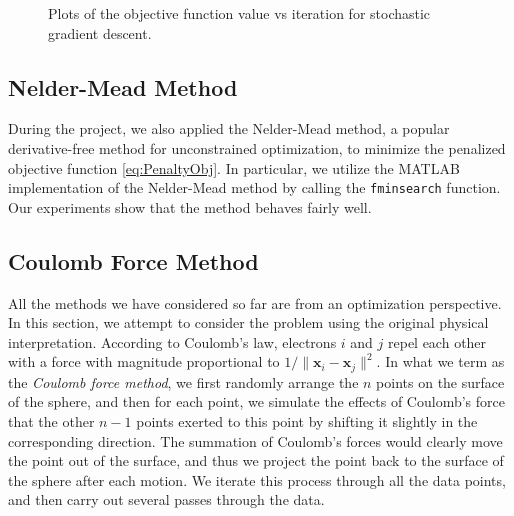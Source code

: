 \documentclass[11pt]{article}
\begin{document}
\begin{figure}[ht]
  \centering
  \caption{Plots of the objective function value vs iteration for stochastic gradient descent.}
  \label{fig:SGDObj}
\end{figure}

\subsection{Nelder-Mead Method}

During the project, we also applied the Nelder-Mead method, a popular derivative-free method for unconstrained optimization, to minimize the penalized objective function \eqref{eq:PenaltyObj}. In particular, we utilize the MATLAB implementation of the Nelder-Mead method by calling the \texttt{fminsearch} function. Our experiments show that the method behaves fairly well.

\subsection{Coulomb Force Method}

All the methods we have considered so far are from an optimization perspective. In this section, we attempt to consider the problem using the original physical interpretation. According to Coulomb's law, electrons $i$ and $j$ repel each other with a force with magnitude proportional to $1/\|\bm{x}_i-\bm{x}_j\|^2$. In what we term as the \emph{Coulomb force method}, we first randomly arrange the $n$ points on the surface of the sphere, and then for each point, we simulate the effects of Coulomb's force that the other $n-1$ points exerted to this point by shifting it slightly in the corresponding direction. The summation of Coulomb's forces would clearly move the point out of the surface, and thus we project the point back to the surface of the sphere after each motion. We iterate this process through all the data points, and then carry out several passes through the data.
\end{document}
